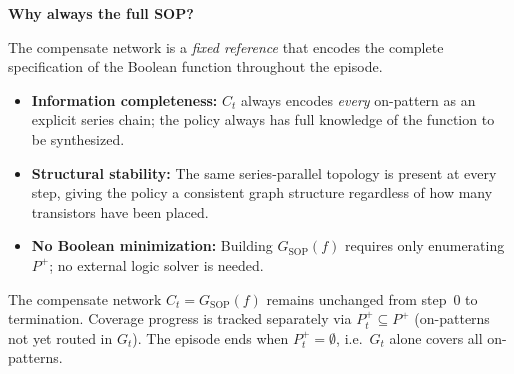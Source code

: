 \documentclass[11pt, a4paper]{article}
\theoremstyle{plain}
\theoremstyle{definition}
\theoremstyle{remark}
\newcommand{\Pplus}{P^{+}}
\newcommand{\GC}[1][]{\mathit{GC}\if\relax\detokenize{#1}\relax\else_{#1}\fi}
\begin{document}
\begin{keybox}
\textbf{Why always the full SOP?}

The compensate network is a \emph{fixed reference} that encodes the
complete specification of the Boolean function throughout the episode.

\begin{itemize}[leftmargin=1.5em, topsep=2pt, itemsep=0pt]
  \item \textbf{Information completeness:} $C_t$ always encodes
    \emph{every} on-pattern as an explicit series chain; the policy
    always has full knowledge of the function to be synthesized.
  \item \textbf{Structural stability:} The same series-parallel
    topology is present at every step, giving the policy a consistent
    graph structure regardless of how many transistors have been placed.
  \item \textbf{No Boolean minimization:} Building $G_{\mathrm{SOP}}(f)$
    requires only enumerating $\Pplus$; no external logic solver is needed.
\end{itemize}
\end{keybox}

The compensate network $C_t = G_{\mathrm{SOP}}(f)$ remains unchanged
from step~0 to termination.  Coverage progress is tracked separately
via $\Pplus_t \subseteq \Pplus$ (on-patterns not yet routed in $G_t$).
The episode ends when $\Pplus_t = \emptyset$, i.e.\ $G_t$ alone covers
all on-patterns.

\begin{center}
\end{center}
\end{document}
